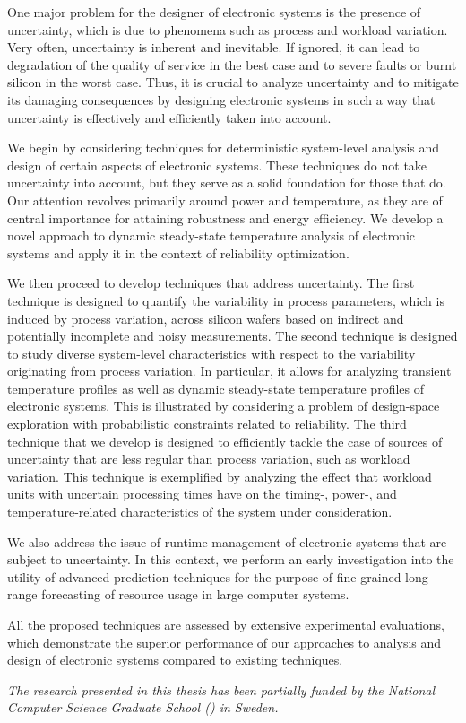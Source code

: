 One major problem for the designer of electronic systems is the presence of
uncertainty, which is due to phenomena such as process and workload variation.
Very often, uncertainty is inherent and inevitable. If ignored, it can lead to
degradation of the quality of service in the best case and to severe faults or
burnt silicon in the worst case. Thus, it is crucial to analyze uncertainty and
to mitigate its damaging consequences by designing electronic systems in such a
way that uncertainty is effectively and efficiently taken into account.

We begin by considering techniques for deterministic system-level analysis and
design of certain aspects of electronic systems. These techniques do not take
uncertainty into account, but they serve as a solid foundation for those that
do. Our attention revolves primarily around power and temperature, as they are
of central importance for attaining robustness and energy efficiency. We develop
a novel approach to dynamic steady-state temperature analysis of electronic
systems and apply it in the context of reliability optimization.

We then proceed to develop techniques that address uncertainty. The first
technique is designed to quantify the variability in process parameters, which
is induced by process variation, across silicon wafers based on indirect and
potentially incomplete and noisy measurements. The second technique is designed
to study diverse system-level characteristics with respect to the variability
originating from process variation. In particular, it allows for analyzing
transient temperature profiles as well as dynamic steady-state temperature
profiles of electronic systems. This is illustrated by considering a problem of
design-space exploration with probabilistic constraints related to reliability.
The third technique that we develop is designed to efficiently tackle the case
of sources of uncertainty that are less regular than process variation, such as
workload variation. This technique is exemplified by analyzing the effect that
workload units with uncertain processing times have on the timing-, power-, and
temperature-related characteristics of the system under consideration.

We also address the issue of runtime management of electronic systems that are
subject to uncertainty. In this context, we perform an early investigation into
the utility of advanced prediction techniques for the purpose of fine-grained
long-range forecasting of resource usage in large computer systems.

All the proposed techniques are assessed by extensive experimental evaluations,
which demonstrate the superior performance of our approaches to analysis and
design of electronic systems compared to existing techniques.

\vspace{1em}
\noindent
\emph{
  The research presented in this thesis has been partially funded by the
  National Computer Science Graduate School () in Sweden.
}
